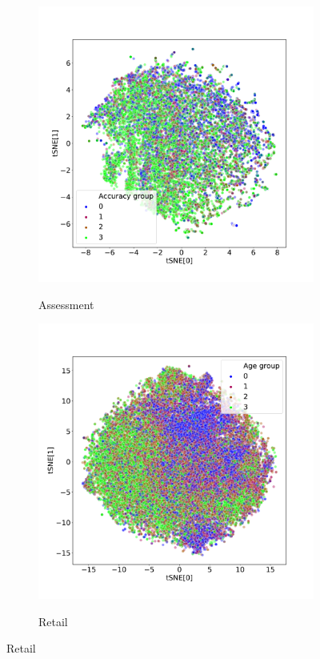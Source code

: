 \documentclass{article}
\begin{document}
\begin{figure}
  \begin{subfigure}{0.5\textwidth}
    \caption{Assessment}
    \includegraphics[width=\textwidth]{figures/bowl-tsne-accuracy_group.pdf}
    \label{fig-tsne-bowl}
  \end{subfigure}%
  \begin{subfigure}{0.5\textwidth}
    \caption{Retail}
    \includegraphics[width=\textwidth]{figures/x5-tsne-age_bin.pdf}
    \label{fig-tsne-x5}
  \end{subfigure}
\end{figure}



\end{document}
